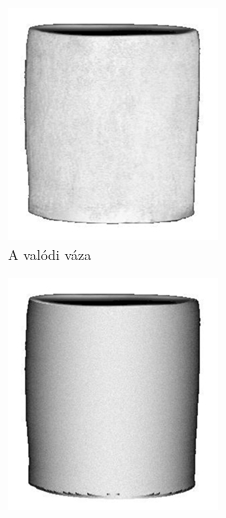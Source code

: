 \begin{figure}[!ht]
    \centering
    \begin{subfigure}[b]{0.25\textwidth}
        \includegraphics[width=\textwidth]{images/vase_a.png}
        \caption{A valódi váza}
    \end{subfigure}
    \hfill
    \begin{subfigure}[b]{0.25\textwidth}
        \includegraphics[width=\textwidth]{images/vase_b.png}

\end{subfigure}
\end{figure}
